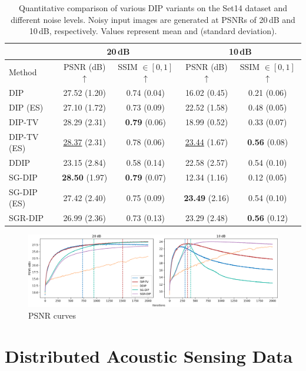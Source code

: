 \begin{table}
    \small
    \centering
    \begin{tabular}{ l c c c c }
        \toprule
        &\multicolumn{2}{c}{20\,dB} &\multicolumn{2}{c}{10\,dB}\\
        \midrule
        Method &PSNR (dB) $\uparrow$ &SSIM $\in [0,1]$ $\uparrow$ &PSNR (dB) $\uparrow$ &SSIM $\in [0,1]$ $\uparrow$\\
        \midrule
        DIP &27.52 {\scriptsize (1.20)} &0.74 {\scriptsize (0.04)} &16.02 {\scriptsize (0.45)} &0.21 {\scriptsize (0.06)} \\
        DIP (ES) &27.10 {\scriptsize (1.72)} &0.73 {\scriptsize (0.09)} &22.52 {\scriptsize (1.58)} &0.48 {\scriptsize (0.05)} \\
        DIP-TV &28.29 {\scriptsize (2.31)} &\textbf{0.79} {\scriptsize (0.06)} &18.99 {\scriptsize (0.52)} &0.33 {\scriptsize (0.07)} \\
        DIP-TV (ES) &\underline{28.37} {\scriptsize (2.31)} &0.78 {\scriptsize (0.06)} &\underline{23.44} {\scriptsize (1.67)} &\textbf{0.56} {\scriptsize (0.08)} \\
        DDIP &23.15 {\scriptsize (2.84)} &0.58 {\scriptsize (0.14)} &22.58 {\scriptsize (2.57)} &0.54 {\scriptsize (0.10)} \\
        SG-DIP &\textbf{28.50} {\scriptsize (1.97)} &\textbf{0.79} {\scriptsize (0.07)} &12.34 {\scriptsize (1.16)} &0.12 {\scriptsize (0.05)} \\
        SG-DIP (ES) &27.42 {\scriptsize (2.40)} &0.75 {\scriptsize (0.09)} &\textbf{23.49} {\scriptsize (2.16)} &0.54 {\scriptsize (0.10)} \\
        SGR-DIP &26.99 {\scriptsize (2.36)} &0.73 {\scriptsize (0.13)} &23.29 {\scriptsize (2.48)} &\textbf{0.56} {\scriptsize (0.12)} \\
        \bottomrule
    \end{tabular}
    \caption{
        Quantitative comparison of various DIP variants on the Set14 dataset and different noise levels.
        Noisy input images are generated at PSNRs of 20\,dB and 10\,dB, respectively.
        Values represent mean and {\scriptsize (standard deviation)}.
    }\label{tab:noise-levels}
\end{table}

\begin{figure}
    \centering
    \includegraphics[width=\textwidth]{img/fig_6.2.png}
    \caption{
        PSNR curves
    }\label{fig:noise-levels}
\end{figure}

\section{Distributed Acoustic Sensing Data}
